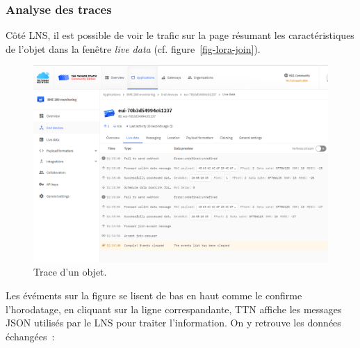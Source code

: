 \subsubsection{Analyse des traces}

Côté LNS, il est possible de voir le trafic sur la page résumant les caractéristiques de l'objet dans la fenêtre \textit{live data} (cf. figure~\vref{fig-lora-join}).

\begin{figure}[tbp]
\centerline{\includegraphics[width=.7\columnwidth]{Pictures/lora-join.png} }
\caption{Trace d'un objet.}
\label{fig-lora-join}
\end{figure}

Les évéments sur la figure se lisent de bas en haut comme le confirme l'horodatage, en cliquant sur la ligne correspandante, TTN affiche les messages JSON utilisés par le LNS pour traiter l'information. On y retrouve les données échangées~:

